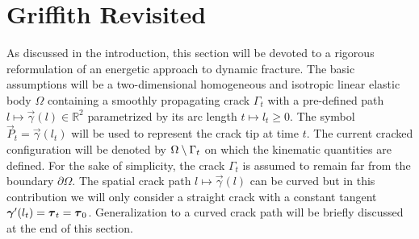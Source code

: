 \appendix

\chapter{Griffith Revisited}
As discussed in the introduction, this section will be devoted to a rigorous reformulation of an energetic approach to dynamic fracture. The basic assumptions will be a two-dimensional homogeneous and isotropic linear elastic body $\Omega$ containing a smoothly propagating crack $\Gamma_t$ with a pre-defined path $l\mapsto\vec{\gamma}(l)\in\mathbb{R}^2$ parametrized by its arc length $t\mapsto l_t\geq 0$. The symbol $\vec{P}_t=\vec{\gamma}(l_t)$ will be used to represent the crack tip at time $t$. The current cracked configuration will be denoted by ${\Omega\setminus\Gamma_t}$ on which the kinematic quantities are defined. For the sake of simplicity, the crack $\Gamma_t$ is assumed to remain far from the boundary $\partial\Omega$. The spatial crack path $l\mapsto\vec{\gamma}(l)$ can be curved but in this contribution we will only consider a straight crack with a constant tangent $\vec{\gamma}'(l_t)=\vtau_t=\vtau_0$. Generalization to a curved crack path will be briefly discussed at the end of this section.

